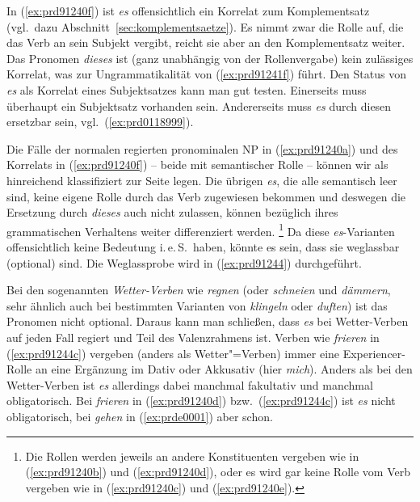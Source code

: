 In (\ref{ex:prd91240f}) ist \textit{es} offensichtlich ein Korrelat zum Komplementsatz (vgl.\ dazu Abschnitt~\ref{sec:komplementsaetze}).
Es nimmt zwar die Rolle auf, die das Verb an sein Subjekt vergibt, reicht sie aber an den Komplementsatz weiter.
Das Pronomen \textit{dieses} ist (ganz unabhängig von der Rollenvergabe) kein zulässiges Korrelat, was zur Ungrammatikalität von (\ref{ex:prd91241f}) führt.
Den Status von \textit{es} als Korrelat eines Subjektsatzes kann man gut testen.
Einerseits muss überhaupt ein Subjektsatz vorhanden sein.
Andererseits muss \textit{es} durch diesen ersetzbar sein, vgl.\ (\ref{ex:prd0118999}).

\begin{exe}
\end{exe}

Die Fälle der normalen regierten pronominalen NP in (\ref{ex:prd91240a}) und des Korrelats in (\ref{ex:prd91240f}) -- beide mit semantischer Rolle -- können wir als hinreichend klassifiziert zur Seite legen.
Die übrigen \textit{es}, die alle semantisch leer sind, keine eigene Rolle durch das Verb zugewiesen bekommen und deswegen die Ersetzung durch \textit{dieses} auch nicht zulassen, können bezüglich ihres grammatischen Verhaltens weiter differenziert werden.%
\footnote{Die Rollen werden jeweils an andere Konstituenten vergeben wie in (\ref{ex:prd91240b}) und (\ref{ex:prd91240d}), oder es wird gar keine Rolle vom Verb vergeben wie in (\ref{ex:prd91240c}) und (\ref{ex:prd91240e}).}
Da diese \textit{es}-Varianten offensichtlich keine Bedeutung i.\,e.\,S.\ haben, könnte es \zB sein, dass sie weglassbar (optional) sind.
Die Weglassprobe wird in (\ref{ex:prd91244}) durchgeführt.

\begin{exe}
  \ex\label{ex:prd91244}
  \begin{xlist}
  \end{xlist}
\end{exe}


Bei den sogenannten \textit{Wetter-Verben} wie \textit{regnen} (oder \textit{schneien} und \textit{dämmern}, sehr ähnlich auch bei bestimmten Varianten von \textit{klingeln} oder \textit{duften}) ist das Pronomen nicht optional.
Daraus kann man schließen, dass \textit{es} bei Wetter-Verben auf jeden Fall regiert und Teil des Valenzrahmens ist.
Verben wie \textit{frieren} in (\ref{ex:prd91244c}) vergeben (anders als Wetter"=Verben) immer eine Experiencer-Rolle an eine Ergänzung im Dativ oder Akkusativ (hier \textit{mich}).
Anders als bei den Wetter-Verben ist \textit{es} allerdings dabei manchmal fakultativ und manchmal obligatorisch.
Bei \textit{frieren} in (\ref{ex:prd91240d}) bzw.\ (\ref{ex:prd91244c}) ist \textit{es} nicht obligatorisch, bei \textit{gehen} in (\ref{ex:prde0001}) aber schon.

